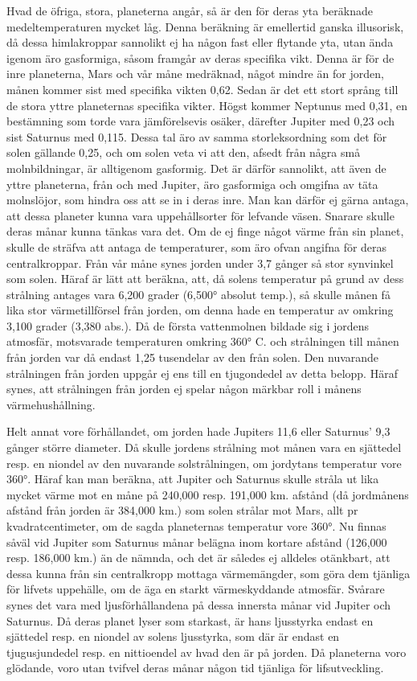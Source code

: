 \documentclass[a4paper, 12pt, oneside, swedish]{article}
\begin{document}
Hvad de öfriga, stora, planeterna angår, så är den för deras yta beräknade medeltemperaturen mycket låg. Denna beräkning är emellertid ganska illusorisk, då dessa himlakroppar sannolikt ej ha någon fast eller flytande yta, utan ända igenom äro gasformiga, såsom framgår av deras specifika vikt. Denna är för de inre planeterna, Mars och vår måne medräknad, något mindre än for jorden, månen kommer sist med specifika vikten 0,62. Sedan är det ett stort språng till de stora yttre planeternas specifika vikter. Högst kommer Neptunus med 0,31, en bestämning som torde vara jämförelsevis osäker, därefter Jupiter med 0,23 och sist Saturnus med 0,115. Dessa tal äro av samma storleksordning som det för solen gällande 0,25, och om solen veta vi att den, afsedt från några små molnbildningar, är alltigenom gasformig. Det är därför sannolikt, att även de yttre planeterna, från och med Jupiter, äro gasformiga och omgifna av täta molnslöjor, som hindra oss att se in i deras inre. Man kan därför ej gärna antaga, att dessa planeter kunna vara uppehållsorter för lefvande väsen. Snarare skulle deras månar kunna tänkas vara det. Om de ej finge något värme från sin planet, skulle de sträfva att antaga de temperaturer, som äro ofvan angifna för deras centralkroppar. Från vår måne synes jorden under 3,7 gånger så stor synvinkel som solen. Häraf är lätt att beräkna, att, då solens temperatur på grund av dess strålning antages vara 6,200 grader (6,500° absolut temp.), så skulle månen få lika stor värmetillförsel från jorden, om denna hade en temperatur av omkring 3,100 grader (3,380 abs.). Då de första vattenmolnen bildade sig i jordens atmosfär, motsvarade temperaturen omkring 360° C. och strålningen till månen från jorden var då endast 1,25 tusendelar av den från solen. Den nuvarande strålningen från jorden uppgår ej ens till en tjugondedel av detta belopp. Häraf synes, att strålningen från jorden ej spelar någon märkbar roll i månens värmehushållning.

Helt annat vore förhållandet, om jorden hade Jupiters 11,6 eller Saturnus' 9,3 gånger större diameter. Då skulle jordens strålning mot månen vara en sjättedel resp. en niondel av den nuvarande solstrålningen, om jordytans temperatur vore 360°. Häraf kan man beräkna, att Jupiter och Saturnus skulle stråla ut lika mycket värme mot en måne på 240,000 resp. 191,000 km. afstånd (då jordmånens afstånd från jorden är 384,000 km.) som solen strålar mot Mars, allt pr kvadratcentimeter, om de sagda planeternas temperatur vore 360°. Nu finnas såväl vid Jupiter som Saturnus månar belägna inom kortare afstånd (126,000 resp. 186,000 km.) än de nämnda, och det är således ej alldeles otänkbart, att dessa kunna från sin centralkropp mottaga värmemängder, som göra dem tjänliga för lifvets uppehälle, om de äga en starkt värmeskyddande atmosfär. Svårare synes det vara med ljusförhållandena på dessa innersta månar vid Jupiter och Saturnus. Då deras planet lyser som starkast, är hans ljusstyrka endast en sjättedel resp. en niondel av solens ljusstyrka, som där är endast en tjugusjundedel resp. en nittioendel av hvad den är på jorden. Då planeterna voro glödande, voro utan tvifvel deras månar någon tid tjänliga för lifsutveckling.
\end{document}
